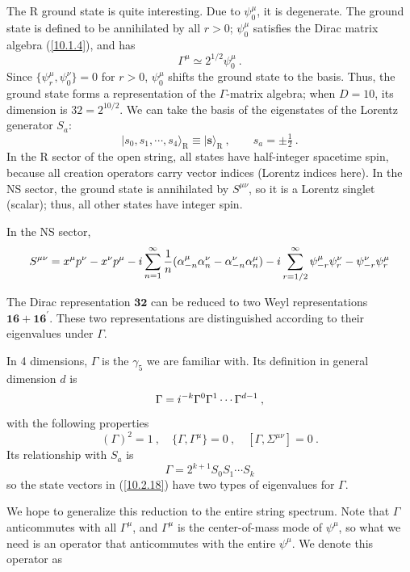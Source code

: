 	The R ground state is quite interesting. Due to $\psi_{0}^{\mu}$, it is degenerate. The ground state is defined to be annihilated by all $r>0$; $\psi_{0}^{\mu}$ satisfies the Dirac matrix algebra (\ref{10.1.4}), and has
	\begin{equation}
		\Gamma^{\mu}\simeq 2^{1/2}\psi_{0}^{\mu} \:.\label{10.2.17}
	\end{equation}
	Since $\{\psi_{r}^{\mu},\psi_{0}^{\nu}\}=0$ for $r>0$, $\psi_{0}^{\mu}$ shifts the ground state to the basis. Thus, the ground state forms a representation of the $\Gamma$-matrix algebra; when $D=10$, its dimension is $32=2^{10/2}$. We can take the basis of the eigenstates of the Lorentz generator $S_{a}$:
	\begin{equation}
		\lvert s_{0},s_{1},\cdots ,s_{4}\rangle_{\text{R}}\equiv \lvert\mathbf{s}\rangle_{\text{R}}\:, 
		\qquad s_{a}=\pm\tfrac{1}{2} \:. \label{10.2.18}
	\end{equation}
	In the R sector of the open string, all states have half-integer spacetime spin, because all creation operators carry vector indices (Lorentz indices here). In the NS sector, the ground state is annihilated by $S^{\mu\nu}$, so it is a Lorentz singlet (scalar); thus, all other states have integer spin.
	\begin{tcolorbox}[breakable]
		In the NS sector,
		\[
		S^{\mu\nu}=x^{\mu}p^{\nu}-x^{\nu}p^{\mu} -i \sum_{n=1}^{\infty}\frac{1}{n}(\alpha_{-n}^{\mu}\alpha_{n}^{\nu}-\alpha^{\nu}_{-n}\alpha_{n}^{\mu})
		-i\sum_{r=1/2}^{\infty}\psi_{-r}^{\mu}\psi_{r}^{\nu}- \psi_{-r}^{\nu}\psi_{r}^{\mu}
		\]
	\end{tcolorbox}
	The Dirac representation $\mathbf{32}$ can be reduced to two Weyl representations $\mathbf{16}+\mathbf{16}^{\prime}$. These two representations are distinguished according to their eigenvalues under $\Gamma$.
	\begin{tcolorbox}[breakable]
		In 4 dimensions, $\Gamma$ is the $\gamma_{5}$ we are familiar with. Its definition in general dimension $d$ is
		\[
		\Gamma=i^{-k}\Gamma^{0}\Gamma^{1}\cdots\Gamma^{d-1}\:, 
		\]
		with the following properties
		\[
		(\Gamma)^{2}=1 \:, \quad \{\Gamma,\Gamma^{\mu}\}=0\:,\quad [\Gamma,\Sigma^{\mu\nu}]=0 \:.
		\]
		Its relationship with $S_{a}$ is
		\[
		\Gamma= 2^{k+1}S_{0}S_{1}\cdots S_{k}
		\]
		so the state vectors in (\ref{10.2.18}) have two types of eigenvalues for $\Gamma$.
	\end{tcolorbox}
	We hope to generalize this reduction to the entire string spectrum. Note that $\Gamma$ anticommutes with all $\Gamma^{\mu}$, and $\Gamma^{\mu}$ is the center-of-mass mode of $\psi^{\mu}$, so what we need is an operator that anticommutes with the entire $\psi^{\mu}$. We denote this operator as
